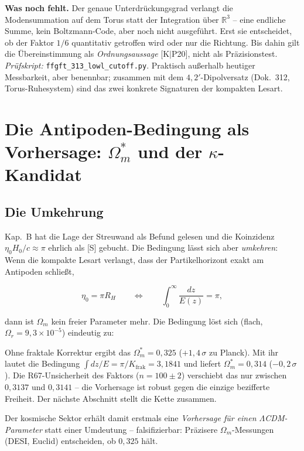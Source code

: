 \textbf{Was noch fehlt.} Der genaue Unterdrückungsgrad verlangt
die Modensummation auf dem Torus statt der Integration über
$\mathbb{R}^3$ -- eine endliche Summe, kein Boltzmann-Code, aber
noch nicht ausgeführt. Erst sie entscheidet, ob der Faktor $1/6$
quantitativ getroffen wird oder nur die Richtung. Bis dahin gilt
die Übereinstimmung als \emph{Ordnungsaussage} [K$|$P20], nicht
als Präzisionstest. \emph{Prüfskript:}
\texttt{ffgft\_313\_lowl\_cutoff.py}. Praktisch außerhalb heutiger
Messbarkeit, aber benennbar; zusammen mit dem
$4{,}2'$-Dipolversatz (Dok.~312, Torus-Ruhesystem) sind das zwei
konkrete Signaturen der kompakten Lesart.

\chapter{Die Antipoden-Bedingung als Vorhersage:
$\Omega_m^{*}$ und der $\kappa$-Kandidat}

\section{Die Umkehrung}

Kap.~B hat die Lage der Streuwand als Befund gelesen und die
Koinzidenz $\eta_0 H_0/c \approx \pi$ ehrlich als [S] gebucht.
Die Bedingung lässt sich aber \emph{umkehren}: Wenn die kompakte
Lesart verlangt, dass der Partikelhorizont exakt am Antipoden
schließt,

\begin{equation}
  \eta_0 = \pi R_H
  \qquad\Longleftrightarrow\qquad
  \int_0^\infty \frac{dz}{E(z)} = \pi,
\end{equation}

dann ist $\Omega_m$ kein freier Parameter mehr. Die Bedingung
löst sich (flach, $\Omega_r = 9{,}3\times10^{-5}$) eindeutig zu:

Ohne fraktale Korrektur ergibt das
$\Omega_m^{*} = 0{,}325$ ($+1{,}4\,\sigma$ zu Planck). Mit ihr
lautet die Bedingung $\int dz/E = \pi/K_\text{frak} = 3{,}1841$
und liefert $\Omega_m^{*} = 0{,}314$ ($-0{,}2\,\sigma$). Die
R67-Unsicherheit des Faktors ($n = 100\pm2$) verschiebt das nur
zwischen $0{,}3137$ und $0{,}3141$ -- die Vorhersage ist robust
gegen die einzige bezifferte Freiheit. Der nächste Abschnitt stellt
die Kette zusammen.

Der kosmische Sektor erhält damit erstmals eine \emph{Vorhersage
für einen $\Lambda$CDM-Parameter} statt einer Umdeutung --
falsifizierbar: Präzisere $\Omega_m$-Messungen (DESI, Euclid)
entscheiden, ob $0{,}325$ hält.

